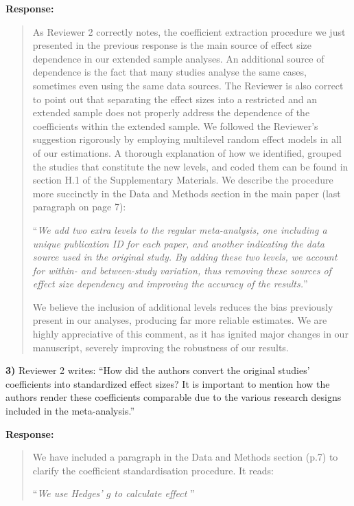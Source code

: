 \documentclass[a4paper,12pt]{article}
\begin{document}
\vspace{.3cm}

\noindent \textbf{Response:} 
\begin{quote}
    As Reviewer 2 correctly notes, the coefficient extraction procedure we just presented in the previous response is the main source of effect size dependence in our extended sample analyses. An additional source of dependence is the fact that many studies analyse the same cases, sometimes even using the same data sources. The Reviewer is also correct to point out that separating the effect sizes into a restricted and an extended sample does not properly address the dependence of the coefficients within the extended sample. We followed the Reviewer's suggestion rigorously by employing multilevel random effect models in all of our estimations. A thorough explanation of how we identified, grouped the studies that constitute the new levels, and coded them can be found in section H.1 of the Supplementary Materials. We describe the procedure more succinctly in the Data and Methods section in the main paper (last paragraph on page 7):
    
    ``\textit{We add two extra levels to the regular meta-analysis, one including a unique publication ID for each paper, and another indicating the data source used in the original study. By adding these two levels, we account for within- and between-study variation, thus removing these sources of effect size dependency and improving the accuracy of the results.}''
    
    We believe the inclusion of additional levels reduces the bias previously present in our analyses, producing far more reliable estimates. We are highly appreciative of this comment, as it has ignited major changes in our manuscript, severely improving the robustness of our results. 
\end{quote}

\vspace{.3cm}

\noindent \textbf{3)} Reviewer 2 writes: ``How did the authors convert the original studies' coefficients into standardized effect sizes? It is important to mention how the authors render these coefficients comparable due to the various research designs included in the meta-analysis.''

\vspace{.3cm}

\noindent \textbf{Response:} 
\begin{quote}
    We have included a paragraph in the Data and Methods section (p.7) to clarify the coefficient standardisation procedure. It reads:
    
    ``\textit{We use Hedges' $g$ to calculate effect }''
\end{quote}
\end{document}
